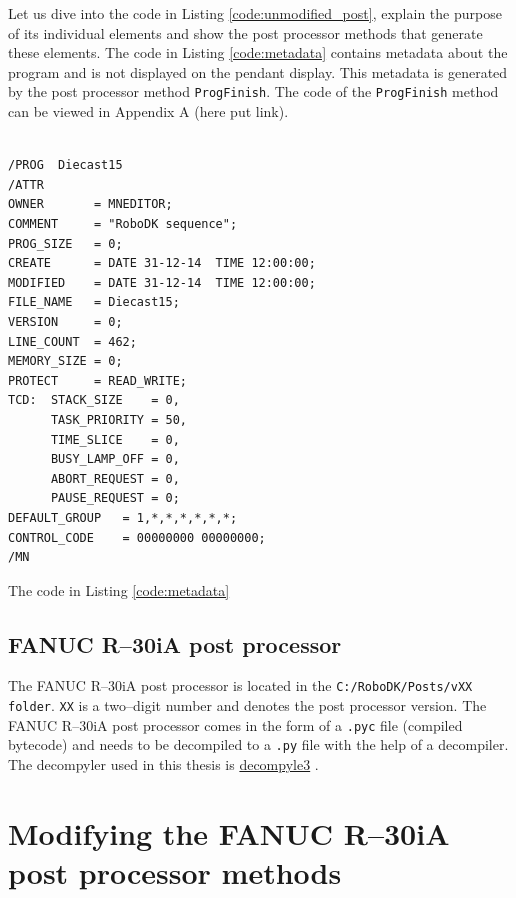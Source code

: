 Let us dive into the code in Listing \ref{code:unmodified_post}, explain the purpose of its individual elements and show the post processor methods that generate these elements. 
The code in Listing \ref{code:metadata} contains metadata about the program and is not displayed on the pendant display. This metadata is generated by the post processor method \texttt{ProgFinish}. The code of the \texttt{ProgFinish} method  can be viewed in Appendix A (here put link).

\begin{code}
\begin{verbatim}

/PROG  Diecast15
/ATTR
OWNER		= MNEDITOR;
COMMENT		= "RoboDK sequence";
PROG_SIZE	= 0;
CREATE		= DATE 31-12-14  TIME 12:00:00;
MODIFIED	= DATE 31-12-14  TIME 12:00:00;
FILE_NAME	= Diecast15;
VERSION		= 0;
LINE_COUNT	= 462;
MEMORY_SIZE	= 0;
PROTECT		= READ_WRITE;
TCD:  STACK_SIZE	= 0,
      TASK_PRIORITY	= 50,
      TIME_SLICE	= 0,
      BUSY_LAMP_OFF	= 0,
      ABORT_REQUEST	= 0,
      PAUSE_REQUEST	= 0;
DEFAULT_GROUP	= 1,*,*,*,*,*,*;
CONTROL_CODE	= 00000000 00000000;
/MN

\end{verbatim}
\label{code:metadata}
\end{code}

The code in Listing \ref{code:metadata}

\subsection{FANUC R--30iA post processor}

The FANUC R--30iA post processor is located in the \texttt{C:/RoboDK/Posts/vXX folder}. \texttt{XX} is a two--digit number and denotes the post processor version. The FANUC R--30iA post processor comes in the form of a \texttt{.pyc} file (compiled bytecode) and needs to be decompiled to a \texttt{.py} file with the help of a decompiler. The decompyler used in this thesis is   \href{https://github.com/rocky/python--decompile3}{decompyle3} \cite{decompyle3}.

\section{Modifying the FANUC R--30iA post processor methods} 

